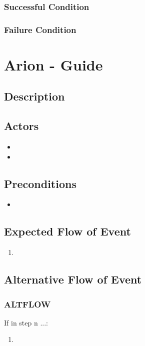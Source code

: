 \documentclass{scrreprt}
\begin{document}
    \subsection{Successful Condition}
    
    \subsection{Failure Condition}


\chapter{Arion - Guide}

\section{Description}

\section{Actors}
\begin{itemize}
    \item 
    \item 
\end{itemize}

\section{Preconditions}
\begin{itemize}
    \item 
\end{itemize}

\section{Expected Flow of Event}
\begin{enumerate}[1.]
    \item 
\end{enumerate}

\section{Alternative Flow of Event}

    \subsection{ALTFLOW}
    If in step n ...:
    \begin{enumerate}
        \item 
    \end{enumerate}
\end{document}
